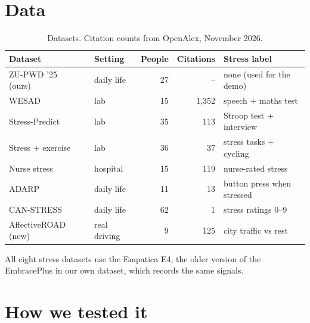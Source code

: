 \documentclass{article}
\begin{document}
\section{Data}

\begin{table}[H]
\centering\small
\caption{Datasets. Citation counts from OpenAlex, November 2026.}
\begin{tabular}{llrrl}
\toprule
Dataset & Setting & People & Citations & Stress label \\
\midrule
ZU-PWD '25~\cite{zupwd} (ours) & daily life & 27 & -- & none (used for the demo) \\
WESAD~\cite{wesad} & lab & 15 & 1{,}352 & speech + maths test \\
Stress-Predict~\cite{stresspredict} & lab & 35 & 113 & Stroop test + interview \\
Stress + exercise~\cite{stressexercise} & lab & 36 & 37 & stress tasks + cycling \\
Nurse stress~\cite{nurse} & hospital & 15 & 119 & nurse-rated stress \\
ADARP~\cite{adarp} & daily life & 11 & 13 & button press when stressed \\
CAN-STRESS~\cite{canstress} & daily life & 62 & 1 & stress ratings 0--9 \\
AffectiveROAD~\cite{affectiveroad} (new) & real driving & 9 & 125 & city traffic vs rest \\
\bottomrule
\end{tabular}
\end{table}

All eight stress datasets use the Empatica E4, the older version of the EmbracePlus in our own dataset, which records the same signals.

\section{How we tested it}
\end{document}
